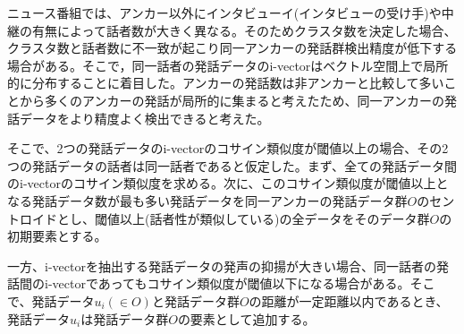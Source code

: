ニュース番組では、アンカー以外にインタビューイ(インタビューの受け手)や中継の有無によって話者数が大きく異なる。そのためクラスタ数を決定した場合、クラスタ数と話者数に不一致が起こり同一アンカーの発話群検出精度が低下する場合がある。そこで，同一話者の発話データのi-vectorはベクトル空間上で局所的に分布することに着目した。アンカーの発話数は非アンカーと比較して多いことから多くのアンカーの発話が局所的に集まると考えたため、同一アンカーの発話データをより精度よく検出できると考えた。\par
そこで、2つの発話データのi-vectorのコサイン類似度が閾値以上の場合、その2つの発話データの話者は同一話者であると仮定した。まず、全ての発話データ間のi-vectorのコサイン類似度を求める。次に、このコサイン類似度が閾値以上となる発話データ数が最も多い発話データを同一アンカーの発話データ群$O$のセントロイドとし、閾値以上(話者性が類似している)の全データをそのデータ群$O$の初期要素とする。\par
一方、i-vectorを抽出する発話データの発声の抑揚が大きい場合、同一話者の発話間のi-vectorであってもコサイン類似度が閾値以下になる場合がある。そこで、発話データ$u_i(\in O)$と発話データ群$O$の距離が一定距離以内であるとき、発話データ$u_i$は発話データ群$O$の要素として追加する。
